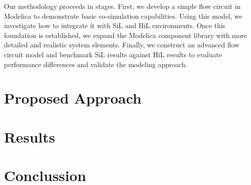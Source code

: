 \documentclass[we,final,11pt,oneside,openany]{uantwerpenbamathesis}
\begin{document}
Our methodology proceeds in stages.
First, we develop a simple flow circuit in Modelica to demonstrate basic co-simulation capabilities.
Using this model, we investigate how to integrate it with SiL and HiL environments.
Once this foundation is established, we expand the Modelica component library with more detailed and realistic system elements.
Finally, we construct an advanced flow circuit model and benchmark SiL results against HiL results to evaluate performance differences and validate the modeling approach.



\chapter{Proposed Approach}
\label{ch:proposed-approach}

\chapter{Results}
\label{ch:results}

\chapter{Conclussion}
\label{ch:conclussion}

\appendix



\end{document}

